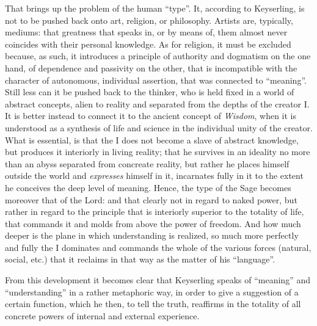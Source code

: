 That brings up the problem of the human ``type''. It, according to Keyserling, is not to be pushed back onto art, religion, or philosophy. Artists are, typically, mediums: that greatness that speaks in, or by means of, them almost never coincides with their personal knowledge. As for religion, it must be excluded because, as such, it introduces a principle of authority and dogmatism on the one hand, of dependence and passivity on the other, that is incompatible with the character of autonomous, individual assertion, that was connected to ``meaning''. Still less can it be pushed back to the thinker, who is held fixed in a world of abstract concepts, alien to reality and separated from the depths of the creator I. It is better instead to connect it to the ancient concept of \emph{Wisdom}, when it is understood as a synthesis of life and science in the individual unity of the creator. What is essential, is that the I does not become a slave of abstract knowledge, but produces it interiorly in living reality; that he survives in an ideality no more than an abyss separated from concreate reality, but rather he places himself outside the world and \emph{expresses} himself in it, incarnates fully in it to the extent he conceives the deep level of meaning. Hence, the type of the Sage becomes moreover that of the Lord: and that clearly not in regard to naked power, but rather in regard to the principle that is interiorly superior to the totality of life, that commands it and molds from above the power of freedom. And how much deeper is the plane in which understanding is realized, so much more perfectly and fully the I dominates and commands the whole of the various forces (natural, social, etc.) that it reclaims in that way as the matter of his ``language''.

From this development it becomes clear that Keyserling speaks of ``meaning'' and ``understanding'' in a rather metaphoric way, in order to give a suggestion of a certain function, which he then, to tell the truth, reaffirms in the totality of all concrete powers of internal and external experience.

